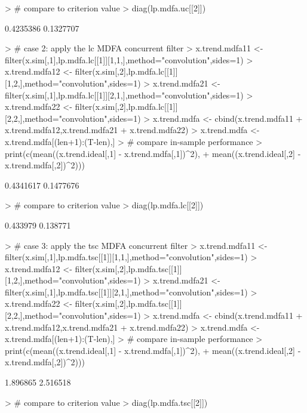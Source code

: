 \documentclass[a4paper]{book}
\begin{document}
\begin{Schunk}
\begin{Sinput}
> # compare to criterion value
> diag(lp.mdfa.uc[[2]])
\end{Sinput}
\begin{Soutput}
[1] 0.4235386 0.1327707
\end{Soutput}
\begin{Sinput}
> # case 2: apply the lc MDFA concurrent filter 
> x.trend.mdfa11 <- filter(x.sim[,1],lp.mdfa.lc[[1]][1,1,],method="convolution",sides=1)
> x.trend.mdfa12 <- filter(x.sim[,2],lp.mdfa.lc[[1]][1,2,],method="convolution",sides=1)
> x.trend.mdfa21 <- filter(x.sim[,1],lp.mdfa.lc[[1]][2,1,],method="convolution",sides=1)
> x.trend.mdfa22 <- filter(x.sim[,2],lp.mdfa.lc[[1]][2,2,],method="convolution",sides=1)
> x.trend.mdfa <- cbind(x.trend.mdfa11 + x.trend.mdfa12,x.trend.mdfa21 + x.trend.mdfa22)
> x.trend.mdfa <- x.trend.mdfa[(len+1):(T-len),] 
> # compare in-sample performance
> print(c(mean((x.trend.ideal[,1] - x.trend.mdfa[,1])^2),
+ 	mean((x.trend.ideal[,2] - x.trend.mdfa[,2])^2)))
\end{Sinput}
\begin{Soutput}
[1] 0.4341617 0.1477676
\end{Soutput}
\begin{Sinput}
> # compare to criterion value
> diag(lp.mdfa.lc[[2]])
\end{Sinput}
\begin{Soutput}
[1] 0.433979 0.138771
\end{Soutput}
\begin{Sinput}
> # case 3: apply the tsc MDFA concurrent filter 
> x.trend.mdfa11 <- filter(x.sim[,1],lp.mdfa.tsc[[1]][1,1,],method="convolution",sides=1)
> x.trend.mdfa12 <- filter(x.sim[,2],lp.mdfa.tsc[[1]][1,2,],method="convolution",sides=1)
> x.trend.mdfa21 <- filter(x.sim[,1],lp.mdfa.tsc[[1]][2,1,],method="convolution",sides=1)
> x.trend.mdfa22 <- filter(x.sim[,2],lp.mdfa.tsc[[1]][2,2,],method="convolution",sides=1)
> x.trend.mdfa <- cbind(x.trend.mdfa11 + x.trend.mdfa12,x.trend.mdfa21 + x.trend.mdfa22)
> x.trend.mdfa <- x.trend.mdfa[(len+1):(T-len),] 
> # compare in-sample performance
> print(c(mean((x.trend.ideal[,1] - x.trend.mdfa[,1])^2),
+ 	mean((x.trend.ideal[,2] - x.trend.mdfa[,2])^2)))
\end{Sinput}
\begin{Soutput}
[1] 1.896865 2.516518
\end{Soutput}
\begin{Sinput}
> # compare to criterion value
> diag(lp.mdfa.tsc[[2]])
\end{Sinput}
\begin{Soutput}

\end{Soutput}
\end{Schunk}
\end{document}
